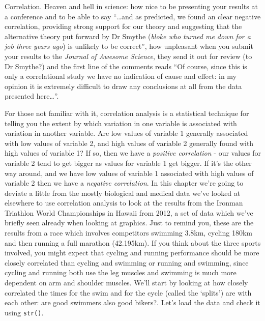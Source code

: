 \documentclass[
]{book}
\begin{document}
Correlation. Heaven and hell in science: how nice to be presenting your results at a conference and to be able to say ``\ldots and as predicted, we found an clear negative correlation, providing strong support for our theory and suggesting that the alternative theory put forward by Dr Smythe (\emph{bloke who turned me down for a job three years ago}) is unlikely to be correct'', how unpleasant when you submit your results to the \emph{Journal of Awesome Science}, they send it out for review (to Dr Smythe?) and the first line of the comments reads ``Of course, since this is only a correlational study we have no indication of cause and effect: in my opinion it is extremely difficult to draw any conclusions at all from the data presented here\ldots{}''.

For those not familiar with it, correlation analysis is a statistical technique for telling you the extent by which variation in one variable is associated with variation in another variable. Are low values of variable 1 generally associated with low values of variable 2, and high values of variable 2 generally found with high values of variable 1? If so, then we have a \emph{positive correlation} - our values for variable 2 tend to get bigger as values for variable 1 get bigger. If it's the other way around, and we have low values of variable 1 associated with high values of variable 2 then we have a \emph{negative correlation}. In this chapter we're going to deviate a little from the mostly biological and medical data we've looked at elsewhere to use correlation analysis to look at the results from the Ironman Triathlon World Championships in Hawaii from 2012, a set of data which we've briefly seen already when looking at graphics. Just to remind you, these are the results from a race which involves competitors swimming 3.8km, cycling 180km and then running a full marathon (42.195km). If you think about the three sports involved, you might expect that cycling and running performance should be more closely correlated than cycling and swimming or running and swimming, since cycling and running both use the leg muscles and swimming is much more dependent on arm and shoulder muscles. We'll start by looking at how closely correlated the times for the swim and for the cycle (called the `splits') are with each other: are good swimmers also good bikers?. Let's load the data and check it using \texttt{str()}.
\end{document}
